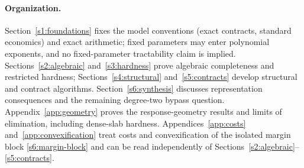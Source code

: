 \paragraph{Organization.}
Section~\ref{s1:foundations} fixes the model conventions (exact
contracts, standard economics) and exact arithmetic; fixed parameters
may enter polynomial exponents, and no fixed-parameter tractability
claim is implied. Sections~\ref{s2:algebraic} and~\ref{s3:hardness}
prove algebraic completeness and restricted hardness;
Sections~\ref{s4:structural} and~\ref{s5:contracts} develop structural
and contract algorithms. Section~\ref{s6:synthesis} discusses
representation consequences and the remaining degree-two bypass
question. Appendix~\ref{app:geometry} proves the response-geometry
results and limits of elimination, including dense-slab hardness.
Appendices~\ref{app:costs} and~\ref{app:convexification} treat costs and
convexification of the isolated margin block \eqref{s6:margin-block}
and can be read independently of
Sections~\ref{s2:algebraic}--\ref{s5:contracts}.
